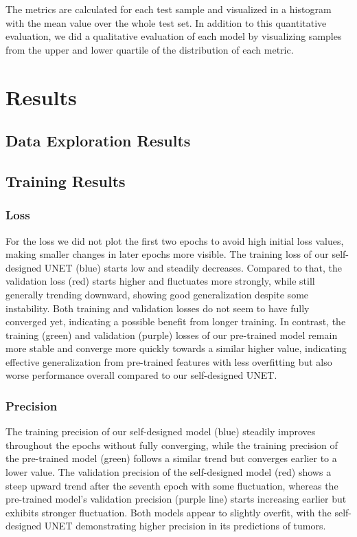 \documentclass[lettersize,journal]{IEEEtran}
\begin{document}
The metrics are calculated for each test sample and visualized in a histogram with the mean value over the whole test set. In addition to this quantitative evaluation, we did a qualitative evaluation of each model by visualizing samples from the upper and lower quartile of the distribution of each metric.


\section[Results]{Results}

\subsection{Data Exploration Results}

\subsection{Training Results}

\subsubsection{\textbf{Loss}}
For the loss we did not plot the first two epochs to avoid high initial loss values, making smaller changes in later epochs more visible. The training loss of our self-designed UNET (blue) starts low and steadily decreases. Compared to that, the validation loss (red) starts higher and fluctuates more strongly, while still generally trending downward, showing good generalization despite some instability. Both training and validation losses do not seem to have fully converged yet, indicating a possible benefit from longer training. In contrast, the training (green) and validation (purple) losses of our pre-trained model remain more stable and converge more quickly towards a similar higher value, indicating effective generalization from pre-trained features with less overfitting but also worse performance overall compared to our self-designed UNET.

\subsubsection{\textbf{Precision}}
The training precision of our self-designed model (blue) steadily improves throughout the epochs without fully converging, while the training precision of the pre-trained model (green) follows a similar trend but converges earlier to a lower value. The validation precision of the self-designed model (red) shows a steep upward trend after the seventh epoch with some fluctuation, whereas the pre-trained model's validation precision (purple line) starts increasing earlier but exhibits stronger fluctuation. Both models appear to slightly overfit, with the self-designed UNET demonstrating higher precision in its predictions of tumors.
\end{document}
